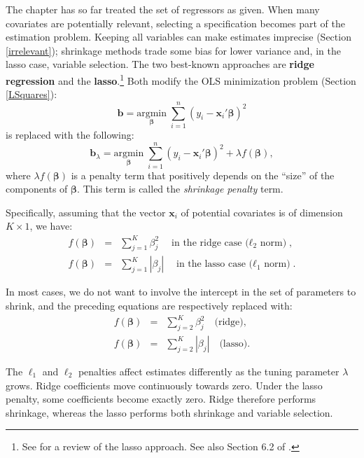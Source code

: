 \documentclass[
  11pt,
]{book}
\theoremstyle{definition}
\theoremstyle{definition}
\theoremstyle{definition}
\theoremstyle{definition}
\theoremstyle{remark}
\begin{document}
The chapter has so far treated the set of regressors as given. When many covariates are potentially relevant, selecting a specification becomes part of the estimation problem. Keeping all variables can make estimates imprecise (Section \ref{irrelevant}); shrinkage methods trade some bias for lower variance and, in the lasso case, variable selection. The two best-known approaches are \textbf{ridge regression} and the \textbf{lasso}.\footnote{See \citet{Tibshirani_2011} for a review of the lasso approach. See also Section 6.2 of \citet{James2013}.} Both modify the OLS minimization problem (Section \ref{LSquares}):
\begin{equation}
\mathbf{b} = \underset{\boldsymbol\beta}{\mbox{argmin}}\; \sum_{i=1}^n(y_i - \mathbf{x}_i'\boldsymbol\beta)^2
\end{equation}
is replaced with the following:
\begin{equation}
\mathbf{b}_\lambda = \underset{\boldsymbol\beta}{\mbox{argmin}}\; \sum_{i=1}^n(y_i - \mathbf{x}_i'\boldsymbol\beta)^2 + \lambda f(\boldsymbol\beta),\label{eq:minLasso}
\end{equation}
where \(\lambda f(\boldsymbol\beta)\) is a penalty term that positively depends on the ``size'' of the components of \(\boldsymbol\beta\). This term is called the \emph{shrinkage penalty} term.

Specifically, assuming that the vector \(\mathbf{x}_i\) of potential covariates is of dimension \(K \times 1\), we have:
\begin{eqnarray*}
f(\boldsymbol\beta) & = & \sum_{j=1}^K \beta_j^2 \quad \mbox{in the ridge case ($\ell_2$ norm)},\\
f(\boldsymbol\beta) & = & \sum_{j=1}^K |\beta_j| \quad \mbox{in the lasso case ($\ell_1$ norm)}.
\end{eqnarray*}

In most cases, we do not want to involve the intercept in the set of parameters to shrink, and the preceding equations are respectively replaced with:
\begin{eqnarray*}
f(\boldsymbol\beta) & = & \sum_{j=2}^K \beta_j^2 \quad \mbox{(ridge)},\\
f(\boldsymbol\beta) & = & \sum_{j=2}^K |\beta_j| \quad \mbox{(lasso)}.
\end{eqnarray*}

The \(\ell_1\) and \(\ell_2\) penalties affect estimates differently as the tuning parameter \(\lambda\) grows. Ridge coefficients move continuously towards zero. Under the lasso penalty, some coefficients become exactly zero. Ridge therefore performs shrinkage, whereas the lasso performs both shrinkage and variable selection.
\end{document}
